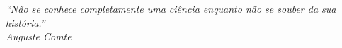 \begin{epigrafe}
    \vspace*{\fill}
    \begin{flushright}
        \textit{``Não se conhece completamente uma ciência enquanto não se souber da sua história.'' \\ Auguste Comte}
    \end{flushright}
\end{epigrafe}

